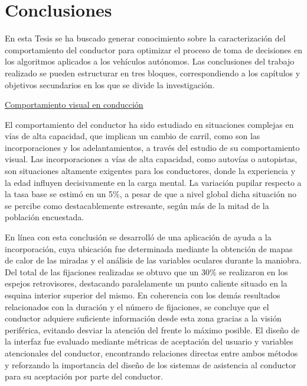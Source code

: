 \section{Conclusiones}
En esta Tesis se ha buscado generar conocimiento sobre la caracterización del comportamiento del conductor para optimizar el proceso de toma de decisiones en los algoritmos aplicados a los vehículos autónomos. Las conclusiones del trabajo realizado se pueden estructurar en tres bloques, correspondiendo a los capítulos y objetivos secundarios en los que se divide la investigación.

\underline{Comportamiento visual en conducción}

El comportamiento del conductor ha sido estudiado en situaciones complejas en vías de alta capacidad, que implican un cambio de carril, como son las incorporaciones y los adelantamientos, a través del estudio de su comportamiento visual. Las incorporaciones a vías de alta capacidad, como autovías o autopistas, son situaciones altamente exigentes para los conductores, donde la experiencia y la edad influyen decisivamente en la carga mental. La variación pupilar respecto a la tasa base se estimó en un 5\%, a pesar de que a nivel global dicha situación no se percibe como destacablemente estresante, según más de la mitad de la población encuestada.  

En línea con esta conclusión se desarrolló de una aplicación de ayuda a la incorporación, cuya ubicación fue determinada mediante la obtención de mapas de calor de las miradas y el análisis de las variables oculares durante la maniobra. Del total de las fijaciones realizadas se obtuvo que un 30\% se realizaron en los espejos retrovisores, destacando paralelamente un punto caliente situado en la esquina interior superior del mismo. En coherencia con los demás resultados relacionados con la duración y el número de fijaciones, se concluye que el conductor adquiere suficiente información desde esta zona gracias a la visión periférica, evitando desviar la atención del frente lo máximo posible. El diseño de la interfaz fue evaluado mediante métricas de aceptación del usuario y variables atencionales del conductor, encontrando relaciones directas entre ambos métodos y reforzando la importancia del diseño de los sistemas de asistencia al conductor para su aceptación por parte del conductor.  


